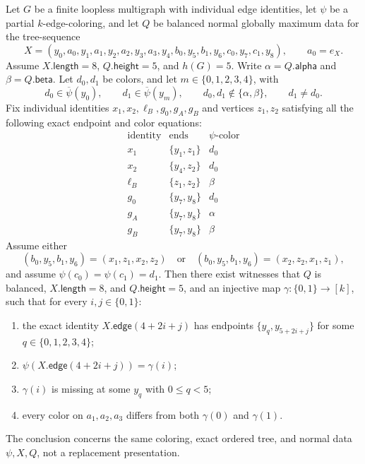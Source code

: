 \begin{helper}
Let $G$ be a finite loopless multigraph with individual edge identities,
let $\psi$ be a partial $k$-edge-coloring, and let $Q$ be balanced normal
globally maximum data for the tree-sequence
\[
 X=(y_0,a_0,y_1,a_1,y_2,a_2,y_3,a_3,y_4,
       b_0,y_5,b_1,y_6,c_0,y_7,c_1,y_8),
 \qquad a_0=e_X.
\]
Assume $X.\mathsf{length}=8$, $Q.\mathsf{height}=5$, and $h(G)=5$.
Write $\alpha=Q.\mathsf{alpha}$ and $\beta=Q.\mathsf{beta}$.
Let $d_0,d_1$ be colors, and let $m\in\{0,1,2,3,4\}$, with
\[
 d_0\in\overline\psi(y_0),\qquad
 d_1\in\overline\psi(y_m),\qquad
 d_0,d_1\notin\{\alpha,\beta\},\qquad d_1\ne d_0.
\]
Fix individual identities $x_1,x_2,\ell_B,g_0,g_A,g_B$ and vertices
$z_1,z_2$ satisfying all the following exact endpoint and color equations:
\[
\begin{array}{c|c|c}
\text{identity}&\operatorname{ends}&\psi\text{-color}\\ \hline
x_1&\{y_1,z_1\}&d_0\\
x_2&\{y_4,z_2\}&d_0\\
\ell_B&\{z_1,z_2\}&\beta\\
g_0&\{y_7,y_8\}&d_0\\
g_A&\{y_7,y_8\}&\alpha\\
g_B&\{y_7,y_8\}&\beta
\end{array}
\]
Assume either
\[
 (b_0,y_5,b_1,y_6)=(x_1,z_1,x_2,z_2)
 \quad\text{or}\quad
 (b_0,y_5,b_1,y_6)=(x_2,z_2,x_1,z_1),
\]
and assume $\psi(c_0)=\psi(c_1)=d_1$.
Then there exist witnesses that $Q$ is balanced,
$X.\mathsf{length}=8$, and $Q.\mathsf{height}=5$, and an injective map
$\gamma:\{0,1\}\to[k]$, such that for every $i,j\in\{0,1\}$:
\begin{enumerate}
\item the exact identity $X.\mathsf{edge}(4+2i+j)$ has endpoints
      $\{y_q,y_{5+2i+j}\}$ for some $q\in\{0,1,2,3,4\}$;
\item $\psi(X.\mathsf{edge}(4+2i+j))=\gamma(i)$;
\item $\gamma(i)$ is missing at some $y_q$ with $0\leq q<5$;
\item every color on $a_1,a_2,a_3$ differs from both
      $\gamma(0)$ and $\gamma(1)$.
\end{enumerate}
The conclusion concerns the same coloring, exact ordered tree, and normal
data $\psi,X,Q$, not a replacement presentation.
\end{helper}
